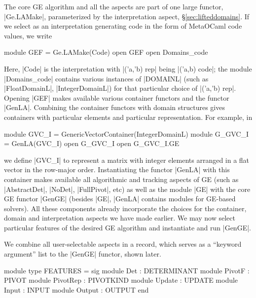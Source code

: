 \documentclass{elsart}
\begin{document}
The core GE algorithm and all the aspects are part of one large
functor, |Ge.LAMake|, parameterized by the interpretation aspect,
\S\ref{sec:lifteddomains}. If we select as an interpretation
generating code in the form of MetaOCaml code values, we write
\begin{code}
module GEF = Ge.LAMake(Code)
open GEF
open Domains_code
\end{code}
Here, |Code| is the interpretation with |('a,'b) rep| being 
|('a,b) code|; the module |Domains_code| contains various instances of |DOMAINL|
(such as \linebreak|FloatDomainL|, |IntegerDomainL|) for that particular
choice of |('a,'b) rep|. Opening |GEF| makes available various
container functors and the functor |GenLA|. Combining
the container functors with domain structures gives containers
with particular elements and particular representation. For example, in
\begin{code}
module GVC_I = GenericVectorContainer(IntegerDomainL)
module G_GVC_I = GenLA(GVC_I)
open G_GVC_I
open G_GVC_I.GE
\end{code}
we define |GVC_I| to represent a matrix with integer elements arranged
in a flat vector in the row-major order. Instantiating the functor |GenLA|
with this container makes available all algorithmic and
tracking aspects of GE (such as |AbstractDet|, |NoDet|, |FullPivot|,
etc) as well as the module |GE| with the core GE functor |GenGE|
(besides |GE|, |GenLA| contains modules for GE-based solvers). All
these components already incorporate the choices for the
container, domain and interpretation aspects we have made earlier. We
may now select particular features of the desired GE algorithm and
instantiate and run |GenGE|.

We combine all user-selectable aspects in a record, which serves as a
``keyword argument'' list to the |GenGE| functor, shown later.
\begin{code}
module type FEATURES = sig
  module Det       : DETERMINANT
  module PivotF    : PIVOT
  module PivotRep  : PIVOTKIND
  module Update    : UPDATE
  module Input     : INPUT
  module Output    : OUTPUT
end
\end{code}
\end{document}
